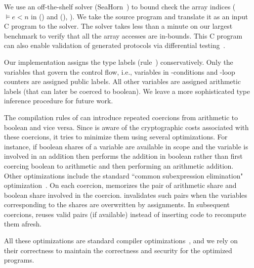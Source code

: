We use an off-the-shelf solver
(SeaHorn~\cite{seahorn}) to bound check the array indices
($\models e < n$
in ({}) and ({}),
). We take the \tool source program and
translate it as an input C program to the solver. The solver takes less
than a minute on our largest benchmark to verify that all the array
accesses are in-bounds. This C program can also enable
validation of \tool generated protocols via differential testing~\cite{mckeeman,frigate}.

Our implementation assigns the type labels (rule~{})
conservatively. Only the variables that govern the control flow, i.e.,
variables in -conditions and -loop counters are
assigned public labels.
All other variables are assigned arithmetic labels (that can later be
coerced to boolean).
We leave a more sophisticated type inference procedure for future work.

The compilation rules of  can introduce
repeated coercions from arithmetic to
boolean and vice versa.
Since \tool is aware of the cryptographic costs associated with these coercions,
it tries to minimize them using several optimizations.
For instance, if boolean shares of a variable are available in scope and the variable is involved in
an addition then \tool performs the addition in boolean rather than first coercing boolean to arithmetic
and then performing an arithmetic addition. 
Other optimizations include the standard ``common subexpression elimination"
optimization~\cite{dragonbook}.
On each coercion, \tool memorizes the pair of arithmetic
share and boolean share involved in the coercion. 
\tool invalidates such pairs when the variables corresponding to the
shares are overwritten by assignments. 
In subsequent coercions, \tool  reuses valid pairs (if available)
instead of inserting code to recompute them afresh.

All these optimizations are standard compiler
optimizations~\cite{dragonbook}, and we rely on their correctness to
maintain the correctness and security for the optimized programs.

